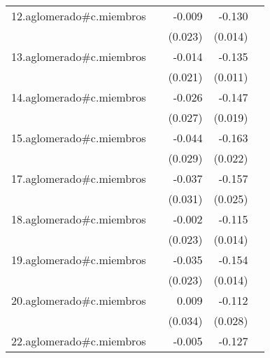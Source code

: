 {\begin{longtable}{l*{4}{D{.}{.}{-1}}}
\addlinespace
12.aglomerado#c.miembros&                     &      -0.009         &      -0.130\sym{***}&                     \\
            &                     &     (0.023)         &     (0.014)         &                     \\
\addlinespace
13.aglomerado#c.miembros&                     &      -0.014         &      -0.135\sym{***}&                     \\
            &                     &     (0.021)         &     (0.011)         &                     \\
\addlinespace
14.aglomerado#c.miembros&                     &      -0.026         &      -0.147\sym{***}&                     \\
            &                     &     (0.027)         &     (0.019)         &                     \\
\addlinespace
15.aglomerado#c.miembros&                     &      -0.044         &      -0.163\sym{***}&                     \\
            &                     &     (0.029)         &     (0.022)         &                     \\
\addlinespace
17.aglomerado#c.miembros&                     &      -0.037         &      -0.157\sym{***}&                     \\
            &                     &     (0.031)         &     (0.025)         &                     \\
\addlinespace
18.aglomerado#c.miembros&                     &      -0.002         &      -0.115\sym{***}&                     \\
            &                     &     (0.023)         &     (0.014)         &                     \\
\addlinespace
19.aglomerado#c.miembros&                     &      -0.035         &      -0.154\sym{***}&                     \\
            &                     &     (0.023)         &     (0.014)         &                     \\
\addlinespace
20.aglomerado#c.miembros&                     &       0.009         &      -0.112\sym{***}&                     \\
            &                     &     (0.034)         &     (0.028)         &                     \\
\addlinespace
22.aglomerado#c.miembros&                     &      -0.005         &      -0.127\sym{***}&                     \\

\end{longtable}}

